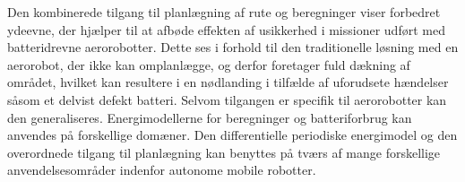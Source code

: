 Den kombinerede tilgang til planl{\ae}gning af rute og beregninger viser forbedret ydeevne, der hj{\ae}lper til at afb{\o}de effekten af usikkerhed i missioner udf{\o}rt med batteridrevne aerorobotter. Dette ses i forhold til den traditionelle l{\o}sning med en aerorobot, der ikke kan omplanl{\ae}gge, og derfor foretager fuld d{\ae}kning af omr{\aa}det, hvilket kan resultere i en n{\o}dlanding i tilf{\ae}lde af uforudsete h{\ae}ndelser s{\aa}som et delvist defekt batteri. Selvom tilgangen er specifik til aerorobotter kan den generaliseres. Energimodellerne for beregninger og batteriforbrug kan anvendes p{\aa} forskellige dom{\ae}ner. Den differentielle periodiske energimodel og den overordnede tilgang til planl{\ae}gning kan benyttes p{\aa} tv{\ae}rs af mange forskellige anvendelsesomr{\aa}der indenfor autonome mobile robotter.


\cleardoublepage   %

